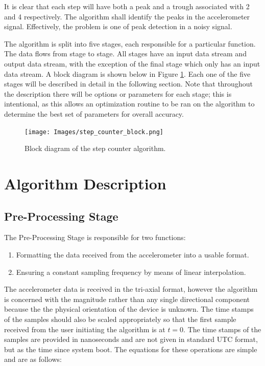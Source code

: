         It is clear that each step will have both a peak and a trough associated with 2 and 4 respectively. The algorithm shall identify the peaks in the accelerometer signal. Effectively, the problem is one of peak detection in a noisy signal. 

        The algorithm is split into five stages, each responsible for a particular function. The data flows from stage to stage. All stages have an input data stream and output data stream, with the exception of the final stage which only has an input data stream. A block diagram is shown below in Figure \ref{img_sc_block}. Each one of the five stages will be described in detail in the following section. Note that throughout the description there will be options or parameters for each stage; this is intentional, as this allows an optimization routine to be ran on the algorithm to determine the best set of parameters for overall accuracy. 

        \begin{figure}[h]
            \texttt{[image: Images/step\_counter\_block.png]}
            \centering
            \caption{Block diagram of the step counter algorithm.}
            \label{img_sc_block}
        \end{figure}

    \chapter{Algorithm Description}

        \section{Pre-Processing Stage}

            The Pre-Processing Stage is responsible for two functions:

            \begin{enumerate}
                \item Formatting the data received from the accelerometer into a usable format.
                \item Ensuring a constant sampling frequency by means of linear interpolation.
            \end{enumerate}

            The accelerometer data is received in the tri-axial format, however the algorithm is concerned with the magnitude rather than any single directional component because the the physical orientation of the device is unknown. The time stamps of the samples should also be scaled appropriately so that the first sample received from the user initiating the algorithm is at $t = 0$. The time stamps of the samples are provided in nanoseconds and are not given in standard UTC format, but as the time since system boot. The equations for these operations are simple and are as follows:

